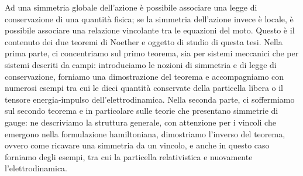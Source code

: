 \begin{Abstract}
\begin{changemargin}{1cm}{1cm}
    Ad una simmetria globale dell'azione è possibile associare una legge di conservazione di una quantità fisica; se la simmetria dell'azione invece è locale, è possibile associare una relazione vincolante tra le equazioni del moto. Questo è il contenuto dei due teoremi di Noether e oggetto di studio di questa tesi. Nella prima parte, ci concentriamo sul primo teorema, sia per sistemi meccanici che per sistemi descriti da campi: introduciamo le nozioni di simmetria e di legge di conservazione, forniamo una dimostrazione del teorema e accompagniamo con numerosi esempi tra cui le dieci quantità conservate della particella libera o il tensore energia-impulso dell'elettrodinamica. Nella seconda parte, ci soffermiamo sul secondo teorema e in particolare sulle teorie che presentano simmetrie di gauge: ne descriviamo la struttura generale, con attenzione per i vincoli che emergono nella formulazione hamiltoniana, dimostriamo l'inverso del teorema, ovvero come ricavare una simmetria da un vincolo, e anche in questo caso forniamo degli esempi, tra cui la particella relativistica e nuovamente l'elettrodinamica. 
\end{changemargin}
\end{Abstract}